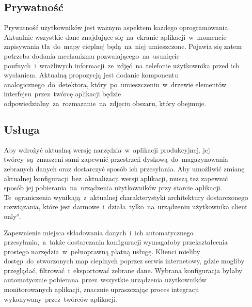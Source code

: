 \subsection{Prywatność}
Prywatność użytkowników jest ważnym aspektem każdego oprogramowania. Aktualnie wszystkie dane znajdujące się~na~ekranie aplikacji~w~momencie zapisywania tła~do~mapy cieplnej będą~na~niej umieszczone. Pojawia się zatem potrzeba dodania mechanizmu pozwalającego~na~usunięcie poufnych~i~wrażliwych informacji~ze~zdjęć~na~telefonie użytkownika przed ich wysłaniem. Aktualną propozycją jest dodanie komponentu analogicznego~do~detektora, który~po~umieszczeniu~w~drzewie elementów interfejsu~przez~twórcę aplikacji będzie odpowiedzialny~za~rozmazanie~na~zdjęciu obszaru, który obejmuje.

\subsection{Usługa}
Aby wdrożyć aktualną wersję narzędzia~w~aplikacji produkcyjnej, jej twórcy~są~zmuszeni sami zapewnić przestrzeń dyskową~do~magazynowania zebranych danych oraz dostarczyć sposób ich przesyłania. Aby umożliwić zmianę aktualnej konfiguracji~bez~aktualizacji wersji aplikacji, muszą też zapewnić sposób jej pobierania~na~urządzenia użytkowników przy starcie aplikacji. Te~ograniczenia wynikają~z~aktualnej charakterystyki architektury dostarczonego rozwiązania, które jest darmowe~i~działa~tylko~na~urządzeniu użytkownika \ang{client only}.

Zapewnienie miejsca składowania danych~i~ich automatycznego przesyłania,~a~także dostarczania konfiguracji wymagałoby przekształcenia prostego narzędzia~w~pełnoprawną płatną usługę. Klienci mieliby dostęp~do~stworzonych map cieplnych poprzez serwis internetowy, gdzie mogliby przeglądać, filtrować~i~eksportować zebrane dane. Wybrana konfiguracja byłaby automatycznie pobierana~przez~wszystkie urządzenia użytkowników monitorowanych aplikacji, znacznie upraszczając proces integracji wykonywany~przez~twórców aplikacji.
